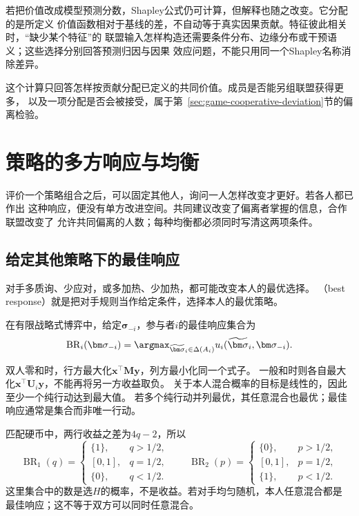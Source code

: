 若把价值改成模型预测分数，Shapley公式仍可计算，但解释也随之改变。它分配的是所定义
价值函数相对于基线的差，不自动等于真实因果贡献。特征彼此相关时，“缺少某个特征”的
联盟输入怎样构造还需要条件分布、边缘分布或干预语义；这些选择分别回答预测归因与因果
效应问题，不能只用同一个Shapley名称消除差异。

这个计算只回答怎样按贡献分配已定义的共同价值。成员是否能另组联盟获得更多，
以及一项分配是否会被接受，属于第~\ref{sec:game-cooperative-deviation}节的偏离检验。

\section{策略的多方响应与均衡}
\label{sec:game-best-response-equilibrium}

评价一个策略组合之后，可以固定其他人，询问一人怎样改变才更好。若各人都已作出
这种响应，便没有单方改进空间。共同建议改变了偏离者掌握的信息，合作联盟改变了
允许共同偏离的人数；每种均衡都必须同时写清这两项条件。

\subsection{给定其他策略下的最佳响应}
\label{sec:game-best-response}

对手多质询、少应对，或多加热、少加热，都可能改变本人的最优选择。
（best response）就是把对手规则当作给定条件，选择本人的最优策略。
\begin{definition}[最佳响应]
\label{def:game-best-response}
在有限战略式博弈中，给定\(\bm\sigma_{-i}\)，参与者\(i\)的最佳响应集合为
\[
  \operatorname{BR}_i(\bm\sigma_{-i})
  =\argmax_{\widetilde{\bm\sigma}_i\in\Delta(A_i)}
       u_i(\widetilde{\bm\sigma}_i,\bm\sigma_{-i}).
\]
\end{definition}
双人零和时，行方最大化\(\bm x^\top\bm M\bm y\)，列方最小化同一个式子。
一般和时则各自最大化\(\bm x^\top\bm U_i\bm y\)，不能再将另一方收益取负。
关于本人混合概率的目标是线性的，因此至少一个纯行动达到最大值。
若多个纯行动并列最优，其任意混合也最优；最佳响应通常是集合而非唯一行动。

匹配硬币中，两行收益之差为\(4q-2\)，所以
\[
 \operatorname{BR}_1(q)=
 \begin{cases}\{1\},&q>1/2,\\[1pt]
 [0,1],&q=1/2,\\[1pt]\{0\},&q<1/2.\end{cases}
 \qquad
 \operatorname{BR}_2(p)=
 \begin{cases}\{0\},&p>1/2,\\[1pt]
 [0,1],&p=1/2,\\[1pt]\{1\},&p<1/2.\end{cases}
\]
这里集合中的数是选\(H\)的概率，不是收益。若对手均匀随机，本人任意混合都是
最佳响应；这不等于双方可以同时任意混合。

